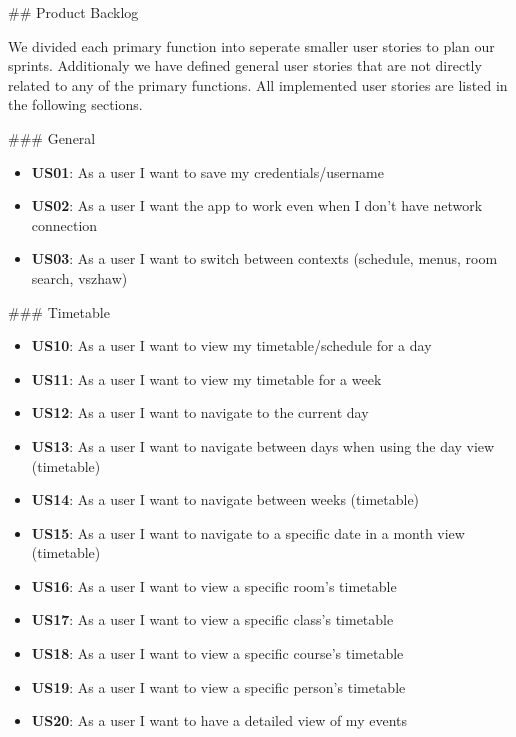 \begin{markdown}
\newpage

## Product Backlog

We divided each primary function into seperate smaller user stories to plan our sprints. Additionaly we have defined general user stories that are not directly related to any of the primary functions. All implemented user stories are listed in the following sections.

### General

\begin{itemize}
  \item \textbf{US01}: As a user I want to save my credentials/username
  \item \textbf{US02}: As a user I want the app to work even when I don't have network connection
  \item \textbf{US03}: As a user I want to switch between contexts (schedule, menus, room search, vszhaw)
\end{itemize}

### Timetable

\begin{itemize}
  \item \textbf{US10}: As a user I want to view my timetable/schedule for a day
  \item \textbf{US11}: As a user I want to view my timetable for a week
  \item \textbf{US12}: As a user I want to navigate to the current day
  \item \textbf{US13}: As a user I want to navigate between days when using the day view (timetable)
  \item \textbf{US14}: As a user I want to navigate between weeks (timetable)
  \item \textbf{US15}: As a user I want to navigate to a specific date in a month view (timetable)
  \item \textbf{US16}: As a user I want to view a specific room's timetable
  \item \textbf{US17}: As a user I want to view a specific class's timetable
  \item \textbf{US18}: As a user I want to view a specific course's timetable
  \item \textbf{US19}: As a user I want to view a specific person's timetable
  \item \textbf{US20}: As a user I want to have a detailed view of my events
\end{itemize}

\newpage


\end{markdown}
